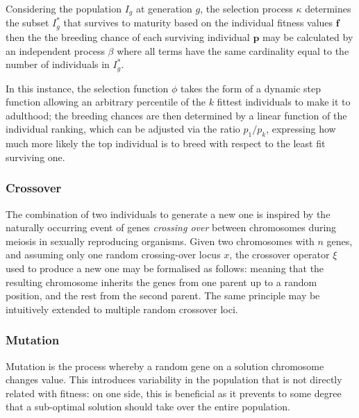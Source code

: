 Considering the population $I_g$ at generation $g$, the selection process $\kappa$ determines the subset $I_g^*$ that survives to maturity based on the individual fitness values $\mathbf{f}$
then the the breeding chance of each surviving individual $\mathbf{p}$ may be calculated by an independent process $\beta$
where all terms have the same cardinality equal to the number of individuals in $I_g^*$.

In this instance, the selection function $\phi$ takes the form of a dynamic step function allowing an arbitrary percentile of the $k$ fittest individuals to make it to adulthood; the breeding chances are then determined by a linear function of the individual ranking, which can be adjusted via the ratio $p_1 / p_k$, expressing how much more likely the top individual is to breed with respect to the least fit surviving one.

\subsubsection{Crossover}
The combination of two individuals to generate a new one is inspired by the naturally occurring event of genes \emph{crossing over} between chromosomes during meiosis in sexually reproducing organisms.
Given two chromosomes with $n$ genes, and assuming only one random crossing-over locus $x$, the crossover operator $\xi$ used to produce a new one may be formalised as follows:
meaning that the resulting chromosome inherits the genes from one parent up to a random position, and the rest from the second parent. The same principle may be intuitively extended to multiple random crossover loci.

\subsubsection{Mutation}
Mutation is the process whereby a random gene on a solution chromosome changes value.
This introduces variability in the population that is not directly related with fitness: on one side, this is beneficial as it prevents to some degree that a sub-optimal solution should take over the entire population.

